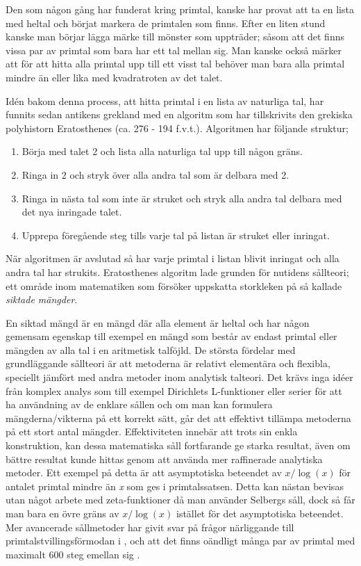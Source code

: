 Den som någon gång har funderat kring primtal, kanske har provat att ta en lista med heltal och börjat markera de primtalen som finns. 
Efter en liten stund kanske man börjar lägga märke till mönster som uppträder; såsom att det finns vissa par av primtal som bara har ett tal mellan sig. 
Man kanske också märker att för att hitta alla primtal upp till ett visst tal behöver man bara alla primtal mindre än eller lika med kvadratroten av det talet.

Idén bakom denna process, att hitta primtal i en lista av naturliga tal, har funnits sedan antikens grekland med en algoritm som har tillskrivits den grekiska polyhistorn Eratosthenes (ca. 276 - 194 f.v.t.). Algoritmen har följande struktur;
\begin{enumerate}
    \item Börja med talet 2 och lista alla naturliga tal upp till någon gräns.
    \item Ringa in 2 och stryk över alla andra tal som är delbara med 2.
    \item Ringa in nästa tal som inte är struket och stryk alla andra tal delbara med det nya inringade talet.
    \item Upprepa föregående steg tills varje tal på listan är struket eller inringat. 
\end{enumerate}
När algoritmen är avslutad så har varje primtal i listan blivit inringat och alla andra tal har strukits. 
Eratosthenes algoritm lade grunden för nutidens sållteori; ett område inom matematiken som försöker uppskatta storkleken på så kallade \textit{siktade mängder}. 

En siktad mängd är en mängd där alla element är heltal och har någon gemensam egenskap till exempel en mängd som består av endast primtal eller mängden av alla tal i en aritmetisk talföjld.
De största fördelar med grundläggande sållteori är att metoderna är relativt elementära och flexibla, speciellt jämfört med andra metoder inom analytisk talteori. 
Det krävs inga idéer från komplex analys som till exempel Dirichlets L-funktioner eller serier för att ha användning av de enklare sållen och om man kan formulera mängderna/vikterna på ett korrekt sätt, går det att effektivt tillämpa metoderna på ett stort antal mängder. 
Effektiviteten innebär att trots sin enkla konstruktion, kan dessa matematiska såll fortfarande ge starka resultat, även om bättre resultat kunde hittas genom att använda mer raffinerade analytiska metoder. 
Ett exempel på detta är att asymptotiska beteendet av \(x/\log(x)\) för antalet primtal mindre än \textit{x} som ges i primtalssatsen. 
Detta kan nästan bevisas utan något arbete med zeta-funktioner då man använder Selbergs såll, dock så får man bara en övre gräns av \(x/\log(x)\) istället för det asymptotiska beteendet. 
Mer avancerade sållmetoder har givit svar på frågor närliggande till primtalstvillingsförmodan i \cite{chen2Prime}, och att det finns oändligt många par av primtal med maximalt 600 steg emellan sig \cite{mayBound}.

